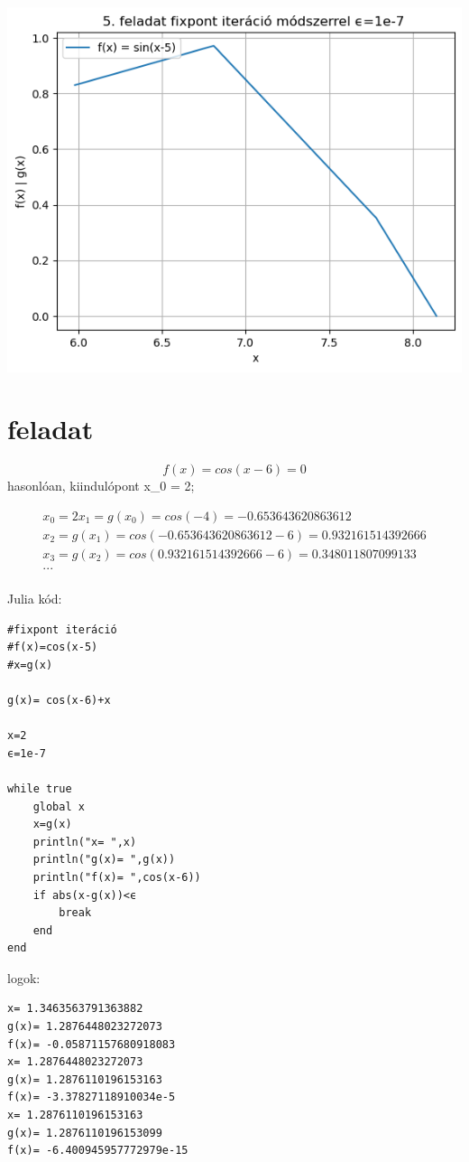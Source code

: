 \documentclass{article}
\begin{document}
\includegraphics[scale=1]{../plot_8_2.png} 

\section{feladat}
\begin{equation}
f(x)= cos(x-6) =0
\end{equation}
hasonlóan, kiindulópont x_0 = 2; 

\begin{multline}
x_0 = 2
x_1 = g(x_0) = cos(-4) = -0.653643620863612\\
x_2 = g(x_1) = cos(-0.653643620863612-6) = 0.932161514392666\\
x_3 = g(x_2) = cos(0.932161514392666-6) = 0.348011807099133\\
...\\
\end{multline}

Julia kód:

\begin{verbatim}
#fixpont iteráció
#f(x)=cos(x-5)
#x=g(x)

g(x)= cos(x-6)+x

x=2
ϵ=1e-7

while true
    global x
    x=g(x)
    println("x= ",x)
    println("g(x)= ",g(x))
    println("f(x)= ",cos(x-6))
    if abs(x-g(x))<ϵ
        break
    end
end
\end{verbatim}

logok:

\begin{verbatim}
x= 1.3463563791363882
g(x)= 1.2876448023272073  
f(x)= -0.05871157680918083
x= 1.2876448023272073       
g(x)= 1.2876110196153163    
f(x)= -3.37827118910034e-5  
x= 1.2876110196153163       
g(x)= 1.2876110196153099    
f(x)= -6.400945957772979e-15
\end{verbatim} 
\end{document}
